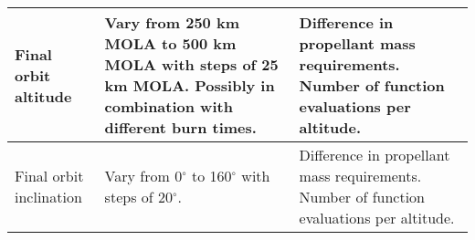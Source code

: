 \begin{table}[!ht]
\begin{center}
\begin{tabular}{|p{4cm}|p{6cm}|p{6cm}|}
Final orbit altitude & Vary from 250 km \ac{MOLA} to 500 km \ac{MOLA} with steps of 25 km \ac{MOLA}. Possibly in combination with different burn times. & Difference in propellant mass requirements. Number of function evaluations per altitude. \\ \hline
Final orbit inclination & Vary from 0$^{\circ}$ to 160$^{\circ}$ with steps of 20$^{\circ}$. & Difference in propellant mass requirements. Number of function evaluations per altitude. \\ \hline

\end{tabular}
\end{center}
\end{table}